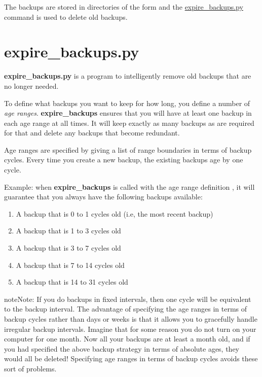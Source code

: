 \documentclass[letterpaper,10pt,english]{sphinxmanual}
\begin{document}
The backups are stored in directories of the form
 and the {\hyperref[contrib:expire-backups-py]{expire\_backups.py}} command is used to
delete old backups.


\section{expire\_backups.py}
\label{contrib:expire-backups-py}
\textbf{expire\_backups.py} is a program to intelligently remove old
backups that are no longer needed.

To define what backups you want to keep for how long, you define a
number of \emph{age ranges}. \textbf{expire\_backups} ensures that you
will have at least one backup in each age range at all times. It will
keep exactly as many backups as are required for that and delete any
backups that become redundant.

Age ranges are specified by giving a list of range boundaries in terms
of backup cycles. Every time you create a new backup, the existing
backups age by one cycle.

Example: when \textbf{expire\_backups} is called with the age range
definition , it will guarantee that you always have the
following backups available:
\begin{enumerate}
\item {} 
A backup that is 0 to 1 cycles old (i.e, the most recent backup)

\item {} 
A backup that is 1 to 3 cycles old

\item {} 
A backup that is 3 to 7 cycles old

\item {} 
A backup that is 7 to 14 cycles old

\item {} 
A backup that is 14 to 31 cycles old

\end{enumerate}

\begin{notice}{note}{Note:}
If you do backups in fixed intervals, then one cycle will be
equivalent to the backup interval. The advantage of specifying the
age ranges in terms of backup cycles rather than days or weeks is
that it allows you to gracefully handle irregular backup intervals.
Imagine that for some reason you do not turn on your computer for
one month. Now all your backups are at least a month old, and if you
had specified the above backup strategy in terms of absolute ages,
they would all be deleted! Specifying age ranges in terms of backup
cycles avoids these sort of problems.
\end{notice}
\end{document}
